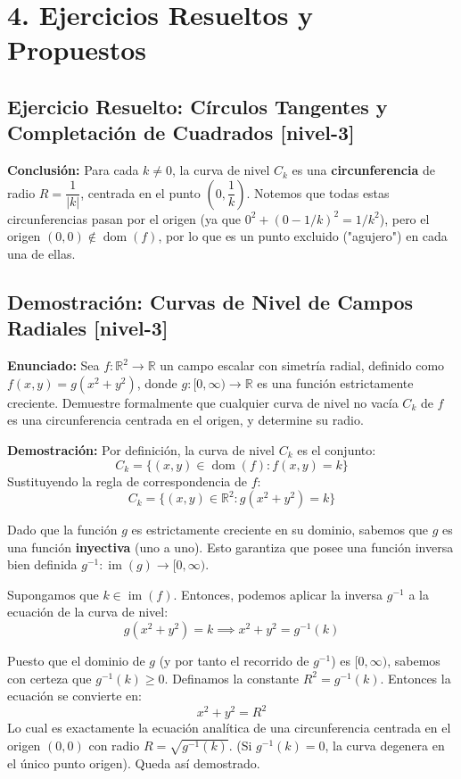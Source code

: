 \documentclass[11pt]{article}
\newenvironment{ejercicios}{%
  \section*{4. Ejercicios Resueltos y Propuestos}%
}{}
\newenvironment{ejercicioresuelto}[2]{\subsection*{Ejercicio Resuelto: #1 \small{[#2]}}}{}
\newenvironment{ejerciciodemostracion}[2]{\subsection*{Demostración: #1 \small{[#2]}}}{}
\newcommand{\enunciado}[1]{\textbf{Enunciado:} #1\par\vspace{0.2cm}}
\newcommand{\demostracion}[1]{\textbf{Demostración:} #1\par\vspace{0.4cm}}
\begin{document}
\begin{ejercicios}
\begin{ejercicioresuelto}{Círculos Tangentes y Completación de Cuadrados}{nivel-3}
{      \textbf{Conclusión:}
      Para cada $k \neq 0$, la curva de nivel $C_k$ es una \textbf{circunferencia} de radio $R = \dfrac{1}{|k|}$, centrada en el punto $(0, \dfrac{1}{k})$. Notemos que todas estas circunferencias pasan por el origen (ya que $0^2 + (0 - 1/k)^2 = 1/k^2$), pero el origen $(0,0) \notin \operatorname{dom}(f)$, por lo que es un punto excluido ("agujero") en cada una de ellas.
    }
  \end{ejercicioresuelto}

  \begin{ejerciciodemostracion}{Curvas de Nivel de Campos Radiales}{nivel-3}
    \enunciado{
      Sea $f \colon \mathbb{R}^2 \to \mathbb{R}$ un campo escalar con simetría radial, definido como $f(x,y) = g(x^2 + y^2)$, donde $g \colon [0, \infty) \to \mathbb{R}$ es una función estrictamente creciente. Demuestre formalmente que cualquier curva de nivel no vacía $C_k$ de $f$ es una circunferencia centrada en el origen, y determine su radio.
    }
    \demostracion{
      Por definición, la curva de nivel $C_k$ es el conjunto:
      $$ C_k = \{ (x,y) \in \operatorname{dom}(f) \colon f(x,y) = k \} $$
      Sustituyendo la regla de correspondencia de $f$:
      $$ C_k = \{ (x,y) \in \mathbb{R}^2 \colon g(x^2 + y^2) = k \} $$
      
      Dado que la función $g$ es estrictamente creciente en su dominio, sabemos que $g$ es una función \textbf{inyectiva} (uno a uno). Esto garantiza que posee una función inversa bien definida $g^{-1} \colon \operatorname{im}(g) \to [0, \infty)$.
      
      Supongamos que $k \in \operatorname{im}(f)$. Entonces, podemos aplicar la inversa $g^{-1}$ a la ecuación de la curva de nivel:
      $$ g(x^2 + y^2) = k \implies x^2 + y^2 = g^{-1}(k) $$
      
      Puesto que el dominio de $g$ (y por tanto el recorrido de $g^{-1}$) es $[0, \infty)$, sabemos con certeza que $g^{-1}(k) \geq 0$.
      Definamos la constante $R^2 = g^{-1}(k)$. Entonces la ecuación se convierte en:
      $$ x^2 + y^2 = R^2 $$
      Lo cual es exactamente la ecuación analítica de una circunferencia centrada en el origen $(0,0)$ con radio $R = \sqrt{g^{-1}(k)}$. (Si $g^{-1}(k) = 0$, la curva degenera en el único punto origen). Queda así demostrado.
    }
  \end{ejerciciodemostracion}


\end{ejercicios}
\end{document}
